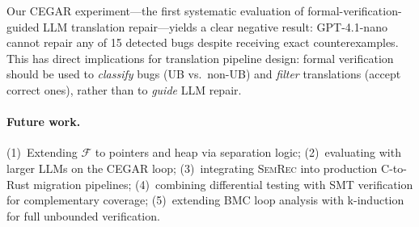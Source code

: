 \documentclass[11pt]{article}
\newcommand{\semrec}{\textsc{SemRec}}
\begin{document}
Our CEGAR experiment---the first systematic evaluation of
formal-verification-guided LLM translation repair---yields a clear negative
result: GPT-4.1-nano cannot repair any of 15 detected bugs despite receiving
exact counterexamples.  This has direct implications for translation pipeline
design: formal verification should be used to \emph{classify} bugs (UB vs.\
non-UB) and \emph{filter} translations (accept correct ones), rather than to
\emph{guide} LLM repair.

\paragraph{Future work.}
(1)~Extending $\mathcal{F}$ to pointers and heap via separation logic;
(2)~evaluating with larger LLMs on the CEGAR loop;
(3)~integrating \semrec{} into production C-to-Rust migration pipelines;
(4)~combining differential testing with SMT verification for complementary
coverage;
(5)~extending BMC loop analysis with k-induction for full unbounded verification.
\end{document}
